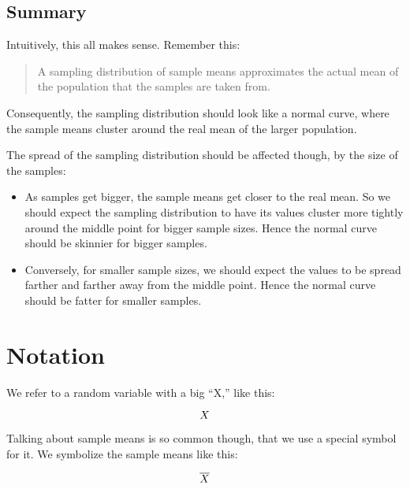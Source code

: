 \documentclass[../../../main.tex]{subfiles}
\begin{document}
\subsection{Summary}

Intuitively, this all makes sense. Remember this:

\begin{quote}
  A sampling distribution of sample means approximates the actual mean of the population that the samples are taken from.
\end{quote}

\noindent
Consequently, the sampling distribution should look like a normal curve, where the sample means cluster around the real mean of the larger population. 

The spread of the sampling distribution should be affected though, by the size of the samples:

\begin{itemize}
  \item As samples get bigger, the sample means get closer to the real mean. So we should expect the sampling distribution to have its values cluster more tightly around the middle point for bigger sample sizes. Hence the normal curve should be skinnier for bigger samples.
  \item Conversely, for smaller sample sizes, we should expect the values to be spread farther and farther away from the middle point. Hence the normal curve should be fatter for smaller samples.
\end{itemize}



\section{Notation}

We refer to a random variable with a big ``X,'' like this:

\begin{equation*}
  \RandVar/
\end{equation*}

\noindent
Talking about sample means is so common though, that we use a special symbol for it. We symbolize the sample means like this:

\begin{equation*}
  \SamplingRandVar/
\end{equation*}
\end{document}
